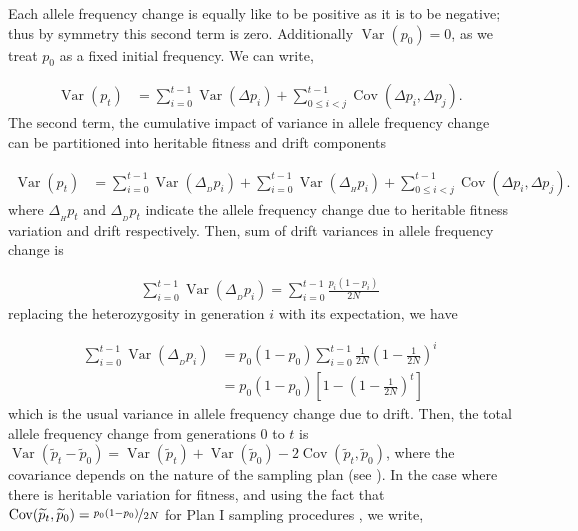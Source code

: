 \documentclass[11pt]{article}
\DeclareMathOperator{\var}{Var}
\DeclareMathOperator{\cov}{Cov}
\begin{document}
Each allele frequency change is equally like to be positive as it is to be
negative; thus by symmetry this second term is zero. Additionally $\var(p_0) = 0$,
as we treat $p_0$ as a fixed initial frequency. We can write, 

\begin{align}
  \var(p_t) &= \sum_{i=0}^{t-1} \var(\Delta p_i) + \sum_{0 \le i < j}^{t-1} \cov(\Delta p_i, \Delta p_j).
\end{align}
%
The second term, the cumulative impact of variance in allele frequency change
can be partitioned into heritable fitness and drift components
\parencite{Santiago1995-hx,Buffalo2019-io}

\begin{align}
  \var(p_t) &= \sum_{i=0}^{t-1} \var(\Delta_{_D} p_i) + \sum_{i=0}^{t-1} \var(\Delta_{_H} p_i) + \sum_{0 \le i < j}^{t-1} \cov(\Delta p_i, \Delta p_j).
\end{align}
%
where $\Delta_{_H} p_t$ and $\Delta_{_D} p_t$ indicate the allele frequency
change due to heritable fitness variation and drift respectively. Then, sum of
drift variances in allele frequency change is

\begin{align}
  \sum_{i=0}^{t-1} \var(\Delta_{_D} p_i) = \sum_{i=0}^{t-1} \frac{p_i(1-p_i)}{2N}
\end{align}
%
replacing the heterozygosity in generation $i$ with its expectation, we have

\begin{align}
  \sum_{i=0}^{t-1} \var(\Delta_{_D} p_i) &= p_0(1-p_0) \sum_{i=0}^{t-1} \frac{1}{2N} \left(1-\frac{1}{2N}\right)^i \\
                                         &= p_0(1-p_0) \left[1 - \left(1-\frac{1}{2N}\right)^t \right]
\end{align}
%
which is the usual variance in allele frequency change due to drift.  Then, the
total allele frequency change from generations $0$ to $t$ is
$\var(\widetilde{p}_t - \widetilde{p}_0) = \var(\widetilde{p}_t) +
\var(\widetilde{p}_0) - 2 \cov(\widetilde{p}_t, \widetilde{p}_0)$, where the
covariance depends on the nature of the sampling plan (see \cite{Nei1981-oy,
Waples1989-sj}). In the case where there is heritable variation for fitness,
and using the fact that $\cov(\widetilde{p}_t, \widetilde{p}_0) =
\nicefrac{p_0(1-p_0)}{2N}$ for Plan I sampling procedures
\parencite{Waples1989-sj}, we write,
\end{document}
